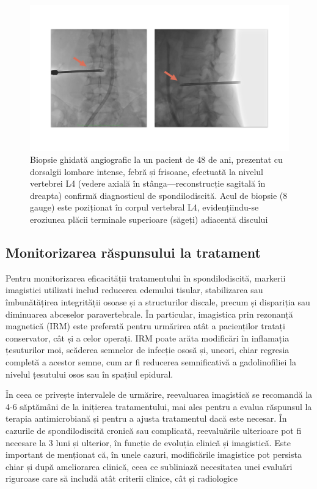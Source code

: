 \message{ !name(LaMain.tex)}\documentclass[romanian,12pt,a4paper]{article}
\begin{document}
\begin{figure}
\centering
\includegraphics[width=\textwidth]{Files/biop-48.png}
\caption{Biopsie ghidată angiografic la un pacient de 48 de ani,
prezentat cu dorsalgii lombare intense, febră și frisoane, efectuată la
nivelul vertebrei L4 (vedere axială în stânga---reconstrucție sagitală
în dreapta) confirmă diagnosticul de spondilodiscită. Acul de biopsie (8
gauge) este poziționat în corpul vertebral L4, evidențiindu-se eroziunea
plăcii terminale superioare (săgeți) adiacentă discului}
\end{figure}

\label{biop-48}{}

\subsection{Monitorizarea răspunsului la tratament}

Pentru monitorizarea eficacității tratamentului în spondilodiscită,
markerii imagistici utilizati includ reducerea edemului tisular,
stabilizarea sau îmbunătățirea integrității osoase și a structurilor
discale, precum și dispariția sau diminuarea abceselor paravertebrale.
În particular, imagistica prin rezonanță magnetică (IRM) este preferată
pentru urmărirea atât a pacienților tratați conservator, cât și a celor
operați. IRM poate arăta modificări în inflamația țesuturilor moi,
scăderea semnelor de infecție ososă și, uneori, chiar regresia completă
a acestor semne, cum ar fi reducerea semnificativă a gadolinofiliei la
nivelul țesutului osos sau în spațiul epidural.
\cite{CorrelationFollowupMRI2020}\cite{SpondylodiscitisUpdateDiagnosis2010}

În ceea ce privește intervalele de urmărire, reevaluarea imagistică se
recomandă la 4-6 săptămâni de la inițierea tratamentului, mai ales
pentru a evalua răspunsul la terapia antimicrobiană și pentru a ajusta
tratamentul dacă este necesar. În cazurile de spondilodiscită cronică
sau complicată, reevaluările ulterioare pot fi necesare la 3 luni și
ulterior, în funcție de evoluția clinică și imagistică. Este important
de menționat că, în unele cazuri, modificările imagistice pot persista
chiar și după ameliorarea clinică, ceea ce subliniază necesitatea unei
evaluări riguroase care să includă atât criterii clinice, cât și
radiologice
\cite{CorrelationFollowupMRI2020}\cite{ImagingAssessmentSpine2024}
\end{document}
